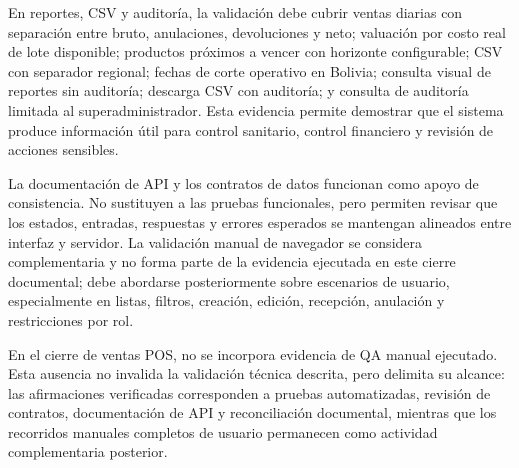 En reportes, CSV y auditoría, la validación debe cubrir ventas diarias con separación entre bruto, anulaciones, devoluciones y neto; valuación por costo real de lote disponible; productos próximos a vencer con horizonte configurable; CSV con separador regional; fechas de corte operativo en Bolivia; consulta visual de reportes sin auditoría; descarga CSV con auditoría; y consulta de auditoría limitada al superadministrador. Esta evidencia permite demostrar que el sistema produce información útil para control sanitario, control financiero y revisión de acciones sensibles.

La documentación de API y los contratos de datos funcionan como apoyo de consistencia. No sustituyen a las pruebas funcionales, pero permiten revisar que los estados, entradas, respuestas y errores esperados se mantengan alineados entre interfaz y servidor. La validación manual de navegador se considera complementaria y no forma parte de la evidencia ejecutada en este cierre documental; debe abordarse posteriormente sobre escenarios de usuario, especialmente en listas, filtros, creación, edición, recepción, anulación y restricciones por rol.

En el cierre de ventas POS, no se incorpora evidencia de QA manual ejecutado. Esta ausencia no invalida la validación técnica descrita, pero delimita su alcance: las afirmaciones verificadas corresponden a pruebas automatizadas, revisión de contratos, documentación de API y reconciliación documental, mientras que los recorridos manuales completos de usuario permanecen como actividad complementaria posterior.

